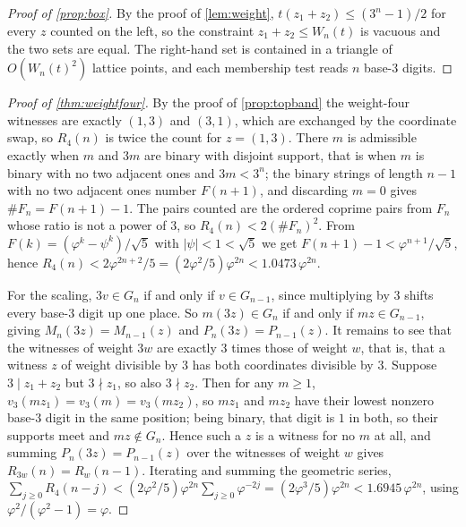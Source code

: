 \documentclass[11pt]{amsart}
\theoremstyle{definition}
\theoremstyle{remark}
\begin{document}
\begin{proof}[Proof of \cref{prop:box}]
By the proof of \cref{lem:weight}, $t(z_1+z_2)\le (3^n-1)/2$ for every $z$ counted on the left, so the constraint $z_1+z_2\le W_n(t)$ is vacuous and the two sets are equal. The right-hand set is contained in a triangle of $O(W_n(t)^2)$ lattice points, and each membership test reads $n$ base-$3$ digits.
\end{proof}

\begin{proof}[Proof of \cref{thm:weightfour}]
By the proof of \cref{prop:topband} the weight-four witnesses are exactly $(1,3)$ and $(3,1)$, which are exchanged by the coordinate swap, so $R_4(n)$ is twice the count for $z=(1,3)$. There $m$ is admissible exactly when $m$ and $3m$ are binary with disjoint support, that is when $m$ is binary with no two adjacent ones and $3m<3^n$; the binary strings of length $n-1$ with no two adjacent ones number $F(n+1)$, and discarding $m=0$ gives $\#F_n=F(n+1)-1$. The pairs counted are the ordered coprime pairs from $F_n$ whose ratio is not a power of $3$, so $R_4(n)<2(\#F_n)^2$. From $F(k)=(\varphi^k-\psi^k)/\sqrt5$ with $|\psi|<1<\sqrt5$ we get $F(n+1)-1<\varphi^{n+1}/\sqrt5$, hence $R_4(n)<2\varphi^{2n+2}/5=(2\varphi^2/5)\varphi^{2n}<1.0473\,\varphi^{2n}$.

For the scaling, $3v\in G_n$ if and only if $v\in G_{n-1}$, since multiplying by $3$ shifts every base-$3$ digit up one place. So $m(3z)\in G_n$ if and only if $mz\in G_{n-1}$, giving $M_n(3z)=M_{n-1}(z)$ and $P_n(3z)=P_{n-1}(z)$. It remains to see that the witnesses of weight $3w$ are exactly $3$ times those of weight $w$, that is, that a witness $z$ of weight divisible by $3$ has both coordinates divisible by $3$. Suppose $3\mid z_1+z_2$ but $3\nmid z_1$, so also $3\nmid z_2$. Then for any $m\ge 1$, $v_3(mz_1)=v_3(m)=v_3(mz_2)$, so $mz_1$ and $mz_2$ have their lowest nonzero base-$3$ digit in the same position; being binary, that digit is $1$ in both, so their supports meet and $mz\notin G_n$. Hence such a $z$ is a witness for no $m$ at all, and summing $P_n(3z)=P_{n-1}(z)$ over the witnesses of weight $w$ gives $R_{3w}(n)=R_w(n-1)$. Iterating and summing the geometric series, $\sum_{j\ge 0}R_4(n-j)<(2\varphi^2/5)\varphi^{2n}\sum_{j\ge 0}\varphi^{-2j}=(2\varphi^3/5)\varphi^{2n}<1.6945\,\varphi^{2n}$, using $\varphi^2/(\varphi^2-1)=\varphi$.
\end{proof}
\end{document}
